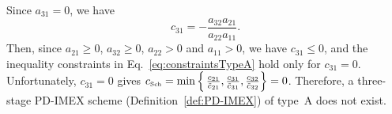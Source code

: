 Since $a_{31} = 0$, we have
\begin{equation*}
  c_{31} = - \frac{a_{32}a_{21}}{a_{22}a_{11}}.  
\end{equation*}
Then, since $a_{21} \geq 0$, $a_{32} \geq 0$, $a_{22} > 0$ and $a_{11} >0$, we have $c_{31} \leq 0$, and the inequality constraints in Eq.~\eqref{eq:constraintsTypeA} hold only for $c_{31} = 0$.
Unfortunately, $c_{31} = 0$ gives $c_{\mbox{\tiny Sch}} = \min \Big\{\,\frac{c_{21}}{\tilde{c}_{21}}, \frac{c_{31}}{\tilde{c}_{31}}, \frac{c_{32}}{\tilde{c}_{32}}\Big\} = 0$.
Therefore, a three-stage PD-IMEX scheme (Definition~\ref{def:PD-IMEX}) of type~A does not exist.
